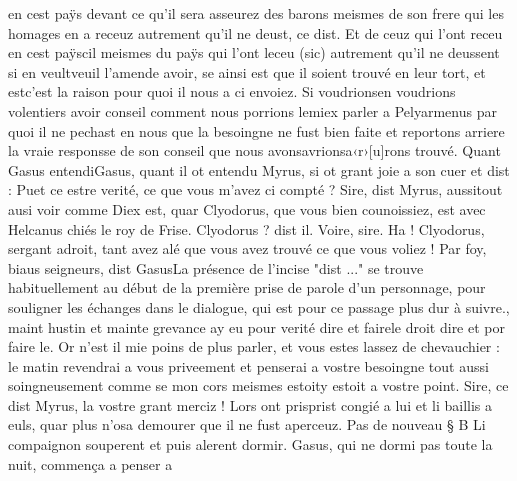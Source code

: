 \documentclass{article}
\begin{document}
\begin{pages}
                        en cest paÿs devant ce qu’il sera asseurez des barons meismes de son frere qui les homages en a receuz
                     autrement qu’il ne deust,
                     ce dist. Et de 
                     ceuz qui l’ont receu en cest paÿscil meismes du paÿs qui l'ont leceu (sic) autrement qu’il ne deussent si en 
                     veultveuil l’amende avoir, se ainsi est que il soient trouvé en leur tort, et 
                     estc'est la raison pour quoi il nous a ci envoiez. Si 
                     voudrionsen voudrions volentiers avoir conseil comment nous porrions 
                     lemiex parler a Pelyarmenus par quoi il
                  ne pechast en nous que la besoingne ne fust bien faite et reportons arriere la
                  vraie responsse de son conseil que nous 
                     avonsavrionsa‹r›[u]rons trouvé. \pend
            \pstart 
                  Quant Gasus entendiGasus, quant il ot entendu
               Myrus, si ot grant joie a son cuer et dist : Puet 
                     ce estre verité, ce que vous m’avez ci compté ?
               Sire, dist Myrus, 
                     aussitout ausi voir comme Diex est, quar Clyodorus,
                  que vous bien counoissiez, est avec Helcanus
                  chiés le roy de Frise.
               Clyodorus ?
                  dist il.
               Voire, sire.
               Ha ! Clyodorus,
                  sergant adroit, tant avez alé que vous avez trouvé ce que vous voliez ! Par foy,
                  biaus seigneurs, dist GasusLa présence de l'incise "dist ..." se trouve habituellement
                     au début de la première prise de parole d'un personnage, pour souligner les
                     échanges dans le dialogue, qui est pour ce passage plus dur à suivre.,
                  maint hustin et mainte grevance ay eu pour 
                     verité dire et fairele droit dire et por faire le. Or n’est il mie poins de plus parler, et vous estes lassez de chevauchier
                  : le matin revendrai a vous priveement et penserai a vostre besoingne tout aussi
                  soingneusement comme se mon cors meismes 
                     estoity estoit a vostre point.
               Sire, 
                     ce dist Myrus, la vostre grant merciz ! Lors 
                  ont prisprist congié 
                  a lui et li baillis a euls, quar plus n’osa demourer que il ne fust aperceuz. \pend
            \pstart Pas de nouveau § B
               Li compaignon souperent et puis alerent dormir. Gasus, qui ne dormi pas toute la nuit, commença a penser a

\end{pages}
\end{document}
